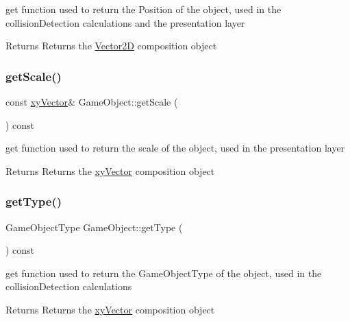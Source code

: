 get function used to return the Position of the object, used in the collision\+Detection calculations and the presentation layer 

\begin{DoxyReturn}{Returns}
Returns the \hyperlink{class_vector2_d}{Vector2D} composition object 
\end{DoxyReturn}
\mbox{\label{class_game_object_a0e0c63e1c3deedae400d62d3ecab8ef3}} 
\subsubsection{\texorpdfstring{get\+Scale()}{getScale()}}
{\footnotesize\ttfamily const \hyperlink{structxy_vector}{xy\+Vector}\& Game\+Object\+::get\+Scale (\begin{DoxyParamCaption}{ }\end{DoxyParamCaption}) const\hspace{0.3cm}{\ttfamily [inline]}}



get function used to return the scale of the object, used in the presentation layer 

\begin{DoxyReturn}{Returns}
Returns the \hyperlink{structxy_vector}{xy\+Vector} composition object 
\end{DoxyReturn}
\mbox{\label{class_game_object_af12345846c74b72bc50c779c00b55851}} 
\subsubsection{\texorpdfstring{get\+Type()}{getType()}}
{\footnotesize\ttfamily Game\+Object\+Type Game\+Object\+::get\+Type (\begin{DoxyParamCaption}{ }\end{DoxyParamCaption}) const\hspace{0.3cm}{\ttfamily [inline]}}



get function used to return the Game\+Object\+Type of the object, used in the collision\+Detection calculations 

\begin{DoxyReturn}{Returns}
Returns the \hyperlink{structxy_vector}{xy\+Vector} composition object 
\end{DoxyReturn}
\mbox{\label{class_game_object_a7cc83eeefc6e3d112e2a7fc1fb037a9c}} 
